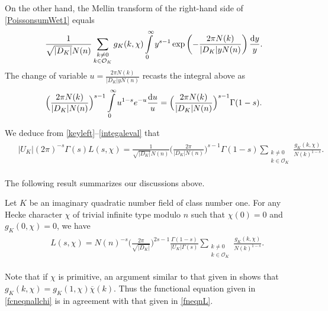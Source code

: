 \documentclass[twoside,leqno,10pt, A4]{amsart}
\begin{document}
   On the other hand, the Mellin transform of the right-hand side of \eqref{PoissonsumWet1} equals
\begin{align} \label{keyright}
 \frac {1}{\sqrt{|D_K|} N(n)}  \sum_{\substack{ k \neq 0 \\ k \in
   \mathcal{O}_K}}g_K(k, \chi) \int\limits_{0}^{\infty}y^{s-1}\exp \left(-\frac {2\pi N(k)}{|D_K| y N(n)}\right)\frac{\mathrm{d} y}{y}.
\end{align}
The change of variable $u=\frac {2\pi N(k)}{|D_K| y N(n)}$ recasts the integral above as
\begin{align}
\begin{split}
\label{integaleval}
 \Big ( \frac {2\pi N(k)}{|D_K|  N(n)} \Big )^{s-1} \int\limits_{0}^{\infty}u^{1-s} e^{-u} \frac{\mathrm{d} u}{u} =\Big ( \frac
{2\pi N(k)}{|D_K|  N(n)} \Big )^{s-1}\Gamma(1-s).
\end{split}
\end{align}  	

   We deduce from  \eqref{keyleft}--\eqref{integaleval} that
\begin{align*} \begin{split}
  & |U_K|(2\pi)^{-s}\Gamma(s) L(s,\chi)=\frac {1}{\sqrt{|D_K|} N(n)} \Big ( \frac {2\pi }{|D_K|  N(n)} \Big
)^{s-1}\Gamma(1-s)\sum_{\substack{ k \neq 0 \\ k \in
   \mathcal{O}_K}}\frac {g_K(k, \chi)}{N(k)^{1-s}}.
\end{split}
\end{align*}

The following result summarizes our discussions above.
\begin{proposition}
\label{Functional equation with Gauss sums}
   Let $K$ be an imaginary quadratic number field of class number one. For any Hecke character $\chi$ of trivial infinite type modulo $n$ such that $\chi(0)=0$ and $g_K(0,\chi)=0$, we have
\begin{align}
\begin{split}
\label{fcneqnallchi}
  &  L(s, \chi)= N(n)^{-s} \Big(\frac {2\pi}{\sqrt{|D_K|}}\Big )^{2s-1}\frac {\Gamma(1-s)}{|U_K|\Gamma(s)} \sum_{\substack{ k \neq 0 \\ k \in
   \mathcal{O}_K}}\frac {g_K(k, \chi)}{N(k)^{1-s}}.
\end{split}
\end{align}
\end{proposition}

  Note that if $\chi$ is primitive, an argument similar to that given in \cite[\S 9]{Da} shows that $g_K(k, \chi)=g_K(1,\chi)\overline{\chi}(k)$. Thus the functional equation given in \eqref{fcneqnallchi} is in agreement with that given in \eqref{fneqnL}.
\end{document}
